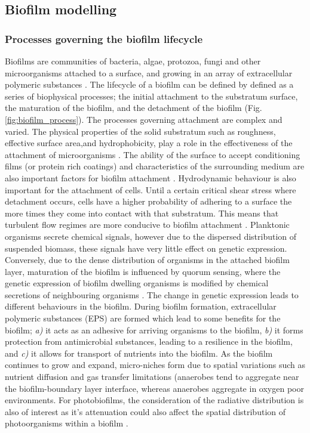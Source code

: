 \subsection{Biofilm modelling}
\label{sec:Intro-biofilm}
\subsubsection{Processes governing the biofilm lifecycle} 
Biofilms are communities of bacteria, algae, protozoa, fungi and other microorganisms attached to a surface, and growing in an array of extracellular polymeric substances \cite{vanloosdrecht2002}.
The lifecycle of a biofilm can be defined by defined as a series of biophysical processes; the initial attachment to the substratum surface, the maturation of the biofilm, and the detachment of the biofilm (Fig. \ref{fig:biofilm_process}). The processes governing attachment are complex and varied. The physical properties of the solid substratum such as roughness, effective surface area,and hydrophobicity, play a role in the effectiveness of the attachment of microorganisms \cite{marshall1990}. The ability of the surface to accept conditioning films (or protein rich coatings) and characteristics of the surrounding medium are also important factors for biofilm attachment \cite{donlan2002}. Hydrodynamic behaviour is also important for the attachment of cells. Until a certain critical shear stress where detachment occurs, cells have a higher probability of adhering to a surface the more times they come into contact with that substratum. This means that turbulent flow regimes are more conducive to biofilm attachment \cite{rijnaarts1993}.
\skippingparagraph
Planktonic organisms secrete chemical signals, however due to the dispersed distribution of suspended biomass, these signals have very little effect on genetic expression. Conversely, due to the dense distribution of organisms in the attached biofilm layer, maturation of the biofilm is influenced by quorum sensing, where the genetic expression of biofilm dwelling organisms is modified by chemical secretions of neighbouring organisms \cite{donlan2002}. The change in genetic expression leads to different behaviours in the biofilm. During biofilm formation, extracellular polymeric substances (EPS) are formed which lead to some benefits for the biofilm; \textit{a)} it acts as an adhesive for arriving organisms to the biofilm, \textit{b)} it forms protection from antimicrobial substances, leading to a resilience in the biofilm, and \textit{c)} it allows for transport of nutrients into the biofilm. As the biofilm continues to grow and expand, micro-niches form due to spatial variations such as nutrient diffusion and gas transfer limitations (anaerobes tend to aggregate near the biofilm-boundary layer interface, whereas anaerobes aggregate in oxygen poor environments. For photobiofilms, the consideration of the radiative distribution is also of interest as it's attenuation could also affect the spatial distribution of photoorganisms within a biofilm \cite{podola2017}.
